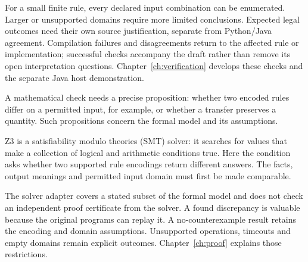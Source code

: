 For a small finite rule, every declared input combination can be enumerated.
Larger or unsupported domains require more limited conclusions. Expected legal
outcomes need their own source justification, separate from Python/Java
agreement. Compilation failures and disagreements return to the affected rule
or implementation; successful checks accompany the draft rather than remove
its open interpretation questions. Chapter~\ref{ch:verification} develops
these checks and the separate Java host demonstration.

\clearpage
{}
A mathematical check needs a precise proposition: whether two encoded rules
differ on a permitted input, for example, or whether a transfer preserves a
quantity. Such propositions concern the formal model and its assumptions.

Z3 is a satisfiability modulo theories (SMT) solver: it searches for values that
make a collection of logical and arithmetic conditions true. Here the condition
asks whether two supported rule encodings return different answers. The facts,
output meanings and permitted input domain must first be made comparable.

\begin{MapDiagram}
\end{MapDiagram}

The solver adapter covers a stated subset of the formal model and does not
check an independent proof certificate from the solver. A found discrepancy is
valuable because the original programs can replay it. A no-counterexample
result retains the encoding and domain assumptions. Unsupported operations,
timeouts and empty domains remain explicit outcomes. Chapter~\ref{ch:proof}
explains those restrictions.

